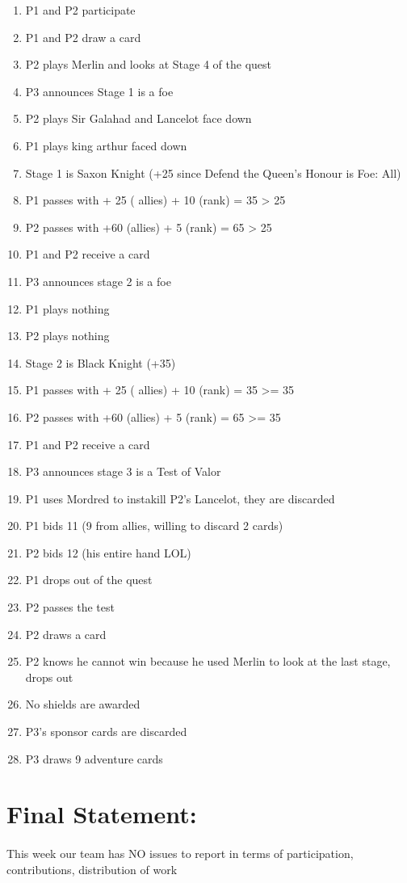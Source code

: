 \documentclass[a4paper,11pt]{article}
\begin{document}
\begin{enumerate}
\item P1 and P2 participate
\item P1 and P2 draw a card
\item P2 plays Merlin and looks at Stage 4 of the quest
\item P3 announces Stage 1 is a foe
\item P2 plays Sir Galahad and Lancelot face down
\item P1 plays king arthur faced down
\item Stage 1 is Saxon Knight (+25 since Defend the Queen’s Honour is Foe: All)
\item P1 passes with + 25 ( allies) + 10 (rank) = 35 > 25
\item P2 passes with +60 (allies) + 5 (rank) = 65 > 25
\item P1 and P2 receive a card
\item P3 announces stage 2 is a foe 
\item P1 plays nothing
\item P2 plays nothing
\item Stage 2 is Black Knight (+35)
\item P1 passes with + 25 ( allies) + 10 (rank) = 35 >= 35
\item P2 passes with +60 (allies) + 5 (rank) = 65 >= 35
\item P1 and P2 receive a card
\item P3 announces stage 3 is a Test of Valor
\item P1 uses Mordred to instakill P2’s Lancelot, they are discarded
\item P1 bids 11 (9 from allies, willing to discard 2 cards)
\item P2 bids 12 (his entire hand LOL)
\item P1 drops out of the quest
\item P2 passes the test
\item P2 draws a card
\item P2 knows he cannot win because he used Merlin to look at the last stage, drops out
\item No shields are awarded
\item P3’s sponsor cards are discarded
\item P3 draws 9 adventure cards
\end{enumerate}


\section{Final Statement:}
\paragraph{}
This week our team has NO issues to report in terms of participation, contributions, distribution of work
\paragraph{}
\end{document}
